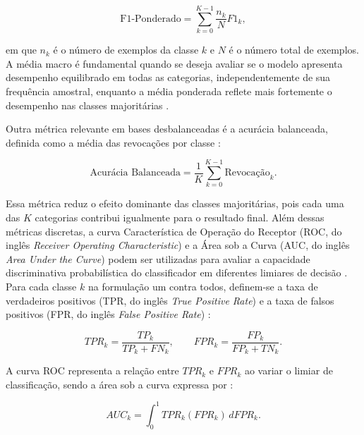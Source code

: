 \documentclass[
    12pt,
    openright,
    oneside,
    a4paper,
    english,
    brazil
]{abntex2}
\begin{document}
\begin{equation}
\label{eq:weighted_f1}
\text{F1-Ponderado} =
\sum_{k=0}^{K-1}
\frac{n_k}{N}
F1_k,
\end{equation}

em que \(n_k\) é o número de exemplos da classe \(k\) e \(N\) é o número total de exemplos. A média macro é fundamental quando se deseja avaliar se o modelo apresenta desempenho equilibrado em todas as categorias, independentemente de sua frequência amostral, enquanto a média ponderada reflete mais fortemente o desempenho nas classes majoritárias \cite{pedregosa2011scikitlearn,sokolova2009systematic}.

Outra métrica relevante em bases desbalanceadas é a acurácia balanceada, definida como a média das revocações por classe \cite{johnson2019survey,sokolova2009systematic}:

\begin{equation}
\label{eq:acuracia_balanceada}
\text{Acurácia Balanceada} =
\frac{1}{K}
\sum_{k=0}^{K-1}
\text{Revocação}_k.
\end{equation}

Essa métrica reduz o efeito dominante das classes majoritárias, pois cada uma das \(K\) categorias contribui igualmente para o resultado final. Além dessas métricas discretas, a curva Característica de Operação do Receptor (ROC, do inglês \textit{Receiver Operating Characteristic}) e a Área sob a Curva (AUC, do inglês \textit{Area Under the Curve}) podem ser utilizadas para avaliar a capacidade discriminativa probabilística do classificador em diferentes limiares de decisão \cite{fawcett2006roc,hand2001simple}. Para cada classe \(k\) na formulação um contra todos, definem-se a taxa de verdadeiros positivos (TPR, do inglês \textit{True Positive Rate}) e a taxa de falsos positivos (FPR, do inglês \textit{False Positive Rate}) \cite{fawcett2006roc}:

\begin{equation}
\label{eq:tpr_fpr}
TPR_k = \frac{TP_k}{TP_k + FN_k},
\qquad
FPR_k = \frac{FP_k}{FP_k + TN_k}.
\end{equation}

A curva ROC representa a relação entre \(TPR_k\) e \(FPR_k\) ao variar o limiar de classificação, sendo a área sob a curva expressa por \cite{fawcett2006roc}:

\begin{equation}
\label{eq:auc_roc}
AUC_k =
\int_{0}^{1}
TPR_k(FPR_k)\,dFPR_k.
\end{equation}
\end{document}
